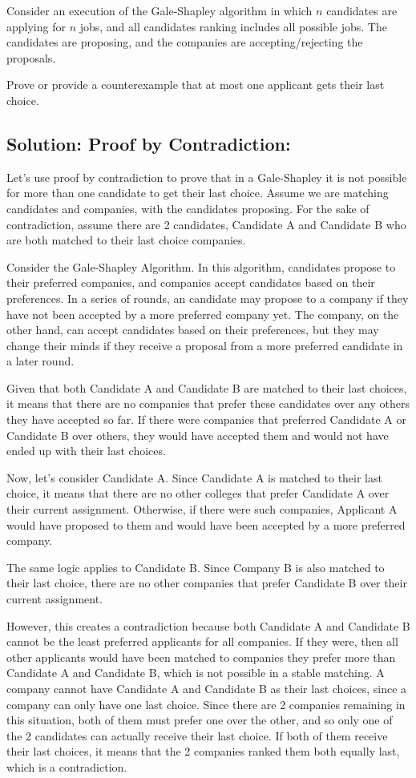 \documentclass[11pt]{article}
\begin{document}
Consider an execution of the Gale-Shapley algorithm in which $n$ candidates are
applying for $n$ jobs, and all candidates ranking includes all possible jobs.
The candidates are proposing, and the companies are accepting/rejecting the
proposals.

Prove or provide a counterexample that at most one applicant gets their last choice.

\subsection{Solution: Proof by Contradiction:}

Let's use proof by contradiction to prove that in a Gale-Shapley it is not possible for more than one candidate to get their last choice. Assume we are matching candidates and companies, with the candidates proposing.
For the sake of contradiction, assume there are 2 candidates, Candidate A and Candidate B who are both matched to their last choice companies.

Consider the Gale-Shapley Algorithm. In this algorithm, candidates propose to their preferred companies, and companies accept candidates based on their preferences. In a series of rounds, an candidate may propose to a company if they have not been accepted by a more preferred company yet. The company, on the other hand, can accept candidates based on their preferences, but they may change their minds if they receive a proposal from a more preferred candidate in a later round.

Given that both Candidate A and Candidate B are matched to their last choices, it means that there are no companies that prefer these candidates over any others they have accepted so far. If there were companies that preferred Candidate A or Candidate B over others, they would have accepted them and would not have ended up with their last choices.

Now, let's consider Candidate A. Since Candidate A is matched to their last choice, it means that there are no other colleges that prefer Candidate A over their current assignment. Otherwise, if there were such companies, Applicant A would have proposed to them and would have been accepted by a more preferred company.

The same logic applies to Candidate B. Since Company B is also matched to their last choice, there are no other companies that prefer Candidate B over their current assignment.

However, this creates a contradiction because both Candidate A and Candidate B cannot be the least preferred applicants for all companies. If they were, then all other applicants would have been matched to companies they prefer more than Candidate A and Candidate B, which is not possible in a stable matching. A company cannot have Candidate A and Candidate B as their last choices, since a company can only have one last choice. Since there are 2 companies remaining in this situation, both of them must prefer one over the other, and so only one of the 2 candidates can actually receive their last choice. If both of them receive their last choices, it means that the 2 companies ranked them both equally last, which is a contradiction.
\end{document}
